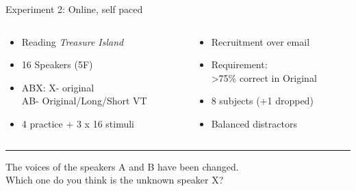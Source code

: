 \documentclass[xcolor={dvipsnames}]{beamer}
\begin{document}
\begin{frame}{Experiment 2: Online, self paced}
\begin{columns}
\begin{column}{0.48\textwidth}
\begin{itemize}
    \item Reading \textit{Treasure Island}
    \item 16 Speakers (5F)
    \item ABX: X- original\\AB- Original/Long/Short VT
    \item 4 practice + 3 x 16 stimuli
\end{itemize}
\end{column}
\begin{column}{0.48\textwidth}
\begin{itemize}
    \item Recruitment over email
    \item Requirement: \\>75\% correct in Original
    \item 8 subjects (+1 dropped)
    \item Balanced distractors
\end{itemize}
\end{column}
\end{columns}
\vskip 0.5cm
\hrule
\vskip 0.2cm
The voices of the speakers A and B have been changed. \\
Which one do you think is the unknown speaker X?
\vskip 0.2cm


\end{frame}
\end{document}
